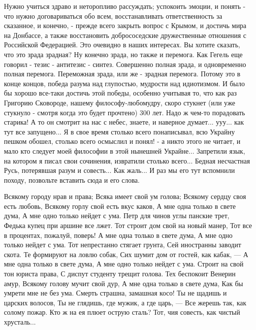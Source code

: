 Нужно учиться здраво и неторопливо рассуждать; успокоить эмоции, и понять - что
нужно договариваться обо всем, восстанавливать ответственность за сказанное, и
конечно, - прежде всего закрыть вопрос с Крымом, и достичь мира на Донбассе, а
также восстановить добрососедские дружественные отношения с Российской
Федерацией. Это очевидно в наших интересах. Вы хотите сказать, что это зрада
зрадная? Ну конечно зрада, но также и перемога. Как Гегель еще говорил - тезис
- антитезис - синтез.  Совершенно полная зрада, и одновременно полная перемога.
Переможная зрада, или же - зрадная перемога.  Потому это в конце концов, победа
разума над глупостью, мудрости над идиотизмом.  И было бы хорошо все-таки
достичь этой победы, особенно учитывая то, что как раз Григорию Сковороде,
нашему философу-любомудру, скоро стукнет (или уже стукнуло - смотря когда это
будет прочтено) 300 лет. Надо ж чем-то порадовать старика! А то он смотрит на
нас с небес, знаете, и наверное думает...  ууу...  как тут все запущено... Я в
свое время столько всего понаписывал, всю Украйну пешком обошел, столько всего
осмыслил и понял! - а никто этого не читает, и мало кто следует моей философии
в этой нынешней Украйне... Запретили язык, на котором я писал свои сочинения,
извратили столько всего... Бедная несчастная Русь, потерявшая разум и
совесть... Как жаль... И раз мы его тут вспомнили походу, позвольте вставить
сюда и его слова.

\raggedcolumns
\begin{multicols}{2} %
\setlength{\parindent}{0pt}
\obeycr
Всякому городу нрав и права;
Всяка имеет свой ум голова;
Всякому сердцу своя есть любовь,
Всякому горлу свой есть вкус каков,
\smallskip
А мне одна только в свете дума,
А мне одно только нейдет с ума.
Петр для чинов углы панские трет,
Федька купец при аршине все лжет.
\smallskip
Тот строит дом свой на новый манер,
Тот все в процентах, пожалуй, поверь!
А мне одна только в свете дума,
А мне одно только нейдет с ума.
\smallskip
Тот непрестанно стягает грунта,
Сей иностранны заводит скота.
Те формируют на ловлю собак,
Сих шумит дом от гостей, как кабак, —
\smallskip
А мне одна только в свете дума,
А мне одно только нейдет с ума.
Строит на свой тон юриста права,
С диспут студенту трещит голова.
\smallskip
Тех беспокоит Венерин амур,
Всякому голову мучит свой дур,
А мне одна только в свете дума,
Как бы умрети мне не без ума.
\smallskip
Смерть страшна, замашная косо!
Ты не щадишь и царских волосов,
Ты не глядишь, где мужик, а где царь, —
Все жерешь так, как солому пожар.
\smallskip
Кто ж на ея плюет острую сталь?
Тот, чия совесть, как чистый хрусталь...
\restorecr
\end{multicols} %

